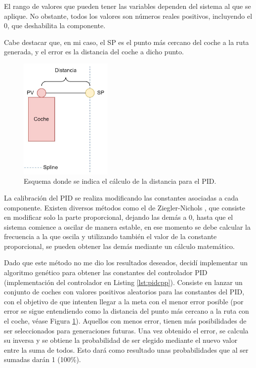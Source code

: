 El rango de valores que pueden tener las variables dependen del sistema al que se aplique. No obstante, todos los valores son números reales positivos, incluyendo el 0, que deshabilita la componente.

\bigskip

Cabe destacar que, en mi caso, el SP es el punto más cercano del coche a la ruta generada, y el error es la distancia del coche a dicho punto.

\begin{figure}[H]
    \centering
    \includegraphics[width=0.4\textwidth]{imagenes/converted/errorPID.jpg}
    \caption{Esquema donde se indica el cálculo de la distancia para el PID.}
    \label{fig:errorpid}
    \end{figure}

La calibración del PID se realiza modificando las constantes asociadas a cada componente. Existen diversos métodos como el de Ziegler-Nichols \cite{10.1115/1.4019264}, que consiste en modificar solo la parte proporcional, dejando las demás a 0, hasta que el sistema comience a oscilar de manera estable, en ese momento se debe calcular la frecuencia a la que oscila y utilizando también el valor de la constante proporcional, se pueden obtener las demás mediante un cálculo matemático.

\bigskip

Dado que este método no me dio los resultados deseados, decidí implementar un algoritmo genético para obtener las constantes del controlador PID (implementación del controlador en Listing \ref{lst:pidcpp}). Consiste en lanzar un conjunto de coches con valores positivos aleatorios para las constantes del PID, con el objetivo de que intenten llegar a la meta con el menor error posible (por error se sigue entendiendo como la distancia del punto más cercano a la ruta con el coche, véase Figura \ref{fig:errorpid}). Aquellos con menos error, tienen más posibilidades de ser seleccionados para generaciones futuras. Una vez obtenido el error, se calcula su inversa y se obtiene la probabilidad de ser elegido mediante el nuevo valor entre la suma de todos. Esto dará como resultado unas probabilidades que al ser sumadas darán 1 (100\%). 

